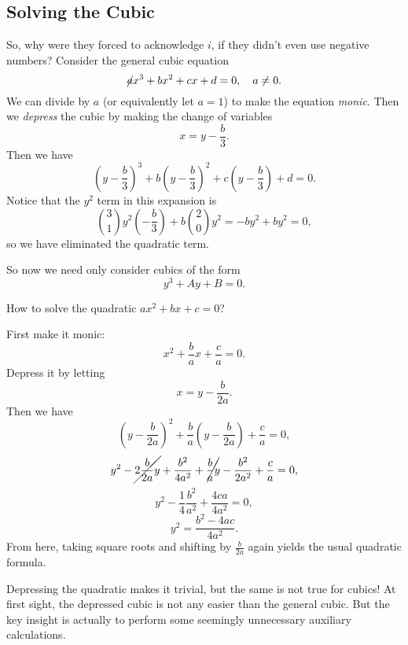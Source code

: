 \subsection{Solving the Cubic}
So, why were they forced to acknowledge $i$, if they
didn't even use negative numbers? Consider the general
cubic equation
\[\cancel{a}x^3 + bx^2 + cx + d = 0, \quad a \ne 0.\]
We can divide by $a$ (or equivalently let $a = 1$) to
make the equation \textit{monic}. Then we \textit{depress}
the cubic by making the change of variables
\[x = y - \frac{b}{3}.\]
Then we have
\[\left(y - \frac{b}{3}\right)^3 + b\left(y - \frac{b}{3}\right)^2 + c\left(y - \frac{b}{3}\right) + d= 0.\]
Notice that the $y^2$ term in this expansion is
\[\binom{3}{1}y^2 \left(-\frac{b}{3}\right) + b\binom{2}{0}y^2 = -by^2 + by^2 = 0,\]
so we have eliminated the quadratic term.

So now we need only consider cubics of the form
\[y^3 + Ay + B = 0.\]

\begin{tcolorbox}[title=Note: Quadratic equations, sharp corners, breakable, enhanced, parbox=false]
  How to solve  the quadratic $ax^2 + bx + c = 0$?

  First make it monic:
  \[x^2 + \frac{b}{a}x + \frac{c}{a} = 0.\]
  Depress it by letting
  \[
  x = y - \frac{b}{2a}
  .\] 
  Then we have
  \[
    \left(y - \frac{b}{2a}\right)^2 + \frac{b}{a}\left(y - \frac{b}{2a}\right) + \frac{c}{a} = 0
  ,\] 
  \[
    y^2 - \cancel{2 \frac{b}{2a} y} + \frac{b^2}{4a^2}
  + \cancel{\frac{b}{a} y} - \frac{b^2}{2a^2}
  + \frac{c}{a} = 0
  ,\]
  \[
    y^2 - \frac{1}{4} \frac{b^2}{a^2} + \frac{4ca}{4a^2}
    = 0
  ,\] 
  \[
  y^2 = \frac{b^2 - 4ac}{4a^2}
  .\] 
  From here, taking square roots and shifting by
  $\frac{b}{2a}$ again yields the usual quadratic formula.
\end{tcolorbox}

Depressing the quadratic makes it trivial, but the
same is not true for cubics! At first sight, the depressed
cubic is not any easier than the general cubic.
But the key insight is actually to perform some seemingly
unnecessary auxiliary calculations.
